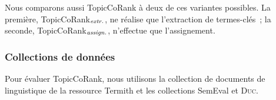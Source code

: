         Nous comparons aussi TopicCoRank à deux de ces variantes possibles. La
        première, TopicCoRank$_\textnormal{\textit{extr.}}$, ne réalise que
        l'extraction de termes-clés~; la seconde,
        TopicCoRank$_\textnormal{\textit{assign.}}$, n'effectue que
        l'assignement.

      \subsubsection{Collections de données}
      \label{subsubsec:main-automatic_keyphrase_annotation-supervised_automatic_keyphrase_annotation-evaluation-evaluation_data}
        Pour évaluer TopicCoRank, nous utilisons la collection de documents de
        linguistique de la ressource Termith et les collections SemEval et
        \textsc{Duc}.
        
